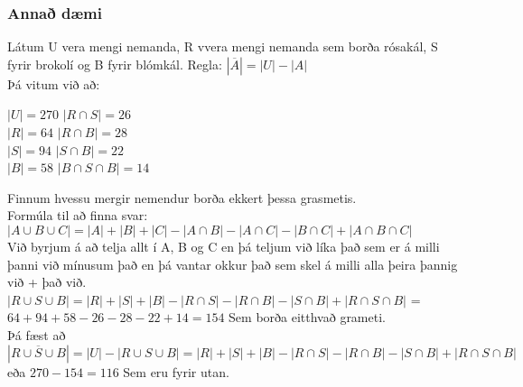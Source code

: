 \subsubsection{Annað dæmi} 
Látum U vera mengi nemanda, R vvera mengi nemanda sem borða rósakál, S fyrir brokolí og B fyrir blómkál. Regla: $|\overline{A}| = |U| - |A|$\\
Þá vitum við að:
\begin{multicols}{2}
    \hspace*{-1.3em}$|U|=270$ \hspace*{0.5em} $|R \cap S| = 26$\\
    $|R|=64$  \hspace*{1em} $|R \cap B| = 28$\\
    $|S|=94$  \hspace*{1.1em} $|S \cap B| = 22$\\
    $|B|=58$  \hspace*{1em} $|B \cap S \cap B| = 14$
    
    \columnbreak
    \vspace*{-1cm}
\end{multicols}
\hspace*{-1.3em}Finnum hvessu mergir nemendur borða ekkert þessa grasmetis.\\ 
Formúla til að finna svar:\\ 
$|A \cup B \cup C| = |A| + |B| + |C| - |A \cap B| - |A \cap C| - |B \cap C| + |A \cap B \cap C|$ \\
Við byrjum á að telja allt í A, B og C en þá teljum við líka það sem er á milli þanni við mínusum það en þá vantar okkur það sem skel á milli alla þeira þannig við + það við.\\
$|R \cup S \cup B| = |R| + |S| + |B| - |R \cap S| - |R \cap B| - |S \cap B| + |R \cap S \cap B|$ =\\
$64 + 94 + 58 - 26 - 28 - 22 + 14 = 154$ Sem borða eitthvað grameti.\\
Þá fæst að $|\overline{R \cup S \cup B}| = |U| - |R \cup S \cup B| = |R| + |S| + |B| - |R \cap S| - |R \cap B| - |S \cap B| + |R \cap S \cap B|$ eða $270 - 154 = 116$ Sem eru fyrir utan.
\newpage

\setcounter{section}{2}
\setcounter{subsection}{2}
